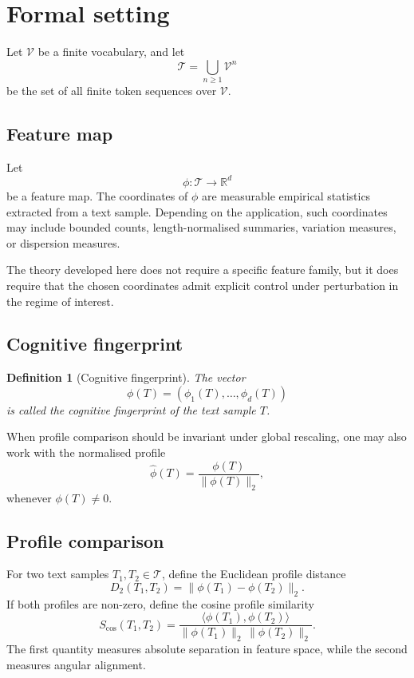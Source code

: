 \documentclass[11pt]{article}
\newtheorem{definition}{Definition}[section]
\begin{document}
\section{Formal setting}

Let $\mathcal{V}$ be a finite vocabulary, and let
\[
\mathcal{T} = \bigcup_{n \geq 1} \mathcal{V}^n
\]
be the set of all finite token sequences over $\mathcal{V}$.

\subsection{Feature map}

Let
\[
\phi : \mathcal{T} \to \mathbb{R}^d
\]
be a feature map. The coordinates of $\phi$ are measurable empirical statistics extracted from a text sample. Depending on the application, such coordinates may include bounded counts, length-normalised summaries, variation measures, or dispersion measures.

The theory developed here does not require a specific feature family, but it does require that the chosen coordinates admit explicit control under perturbation in the regime of interest.

\subsection{Cognitive fingerprint}

\begin{definition}[Cognitive fingerprint]
The vector
\[
\phi(T) = (\phi_1(T), \ldots, \phi_d(T))
\]
is called the \emph{cognitive fingerprint} of the text sample $T$.
\end{definition}

When profile comparison should be invariant under global rescaling, one may also work with the normalised profile
\[
\widehat{\phi}(T) = \frac{\phi(T)}{\|\phi(T)\|_2},
\]
whenever $\phi(T) \neq 0$.

\subsection{Profile comparison}

For two text samples $T_1, T_2 \in \mathcal{T}$, define the Euclidean profile distance
\[
D_2(T_1, T_2) = \|\phi(T_1) - \phi(T_2)\|_2.
\]
If both profiles are non-zero, define the cosine profile similarity
\[
S_{\cos}(T_1, T_2) = \frac{\langle \phi(T_1), \phi(T_2) \rangle}{\|\phi(T_1)\|_2\,\|\phi(T_2)\|_2}.
\]
The first quantity measures absolute separation in feature space, while the second measures angular alignment.
\end{document}
